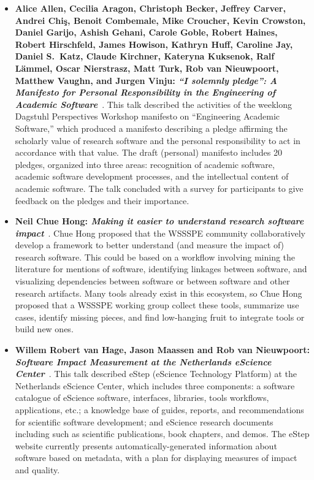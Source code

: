\documentclass[11pt, oneside]{amsart}
\begin{document}
\begin{itemize}[itemsep=1ex]
    \item \textbf{Alice Allen, Cecilia Aragon, Christoph Becker, Jeffrey Carver,
    Andrei Chi\c{s}, Benoit Combemale, Mike Croucher, Kevin Crowston, Daniel Garijo,
    Ashish Gehani, Carole Goble\textsuperscript{\textasteriskcentered},
    Robert Haines, Robert Hirschfeld, James Howison,
    Kathryn Huff, Caroline Jay, Daniel S.~Katz, Claude Kirchner, Kateryna Kuksenok,
    Ralf L\"{a}mmel, Oscar Nierstrasz, Matt Turk, Rob van Nieuwpoort, Matthew Vaughn,
    and Jurgen Vinju: \emph{``I solemnly pledge'': A Manifesto for Personal
    Responsibility in the Engineering of Academic Software}}~\cite{AAllen:2016ws}.
    This talk described the activities of the weeklong Dagstuhl Perspectives Workshop
    manifesto on ``Engineering Academic Software,'' which produced a manifesto
    describing a pledge affirming the scholarly value of research software and
    the personal responsibility to act in accordance with that value. The draft
    (personal) manifesto includes 20 pledges, organized into three areas:
    recognition of academic software, academic software development processes,
    and the intellectual content of academic software. The talk concluded with a
    survey for participants to give feedback on the pledges and their importance.

    \item \textbf{Neil Chue Hong\textsuperscript{\textasteriskcentered}:
    \textit{Making it easier to understand research software impact}}~\cite{ChueHong:2016wsb}.
    Chue Hong proposed that the WSSSPE community collaboratively develop a framework
    to better understand (and measure the impact of) research software. This could
    be based on a workflow involving mining the literature for mentions of software,
    identifying linkages between software, and visualizing dependencies between
    software or between software and other research artifacts. Many tools already
    exist in this ecosystem, so Chue Hong proposed that a WSSSPE working group
    collect these tools, summarize use cases, identify missing pieces, and find
    low-hanging fruit to integrate tools or build new ones.

    \item \textbf{Willem Robert van Hage\textsuperscript{\textasteriskcentered},
    Jason Maassen and Rob van Nieuwpoort: \textit{Software Impact Measurement at the
    Netherlands eScience Center}}~\cite{vanHage:2016ws}.
    This talk described eStep (eScience Technology Platform) at the Netherlands
    eScience Center, which includes three components: a software catalogue
    of eScience software, interfaces, libraries,
    tools workflows, applications, etc.; a knowledge base of guides, reports, and
    recommendations for scientific software development; and eScience research
    documents including such as scientific publications, book chapters, and demos.
    The eStep website currently presents automatically-generated information about
    software based on metadata, with a plan for displaying measures of impact and
    quality.


\end{itemize}
\end{document}
